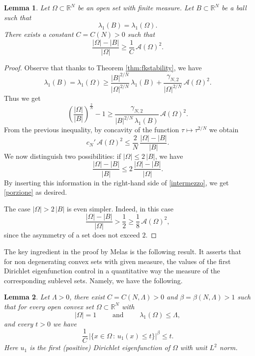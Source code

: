 \documentclass{amsart}
\newtheorem{lemma}{Lemma}[section]
\theoremstyle{definition}
\numberwithin{equation}{section}
\begin{document}
\begin{lemma}
\label{lm:porzione}
Let $\Omega\subset\mathbb{R}^N$ be an open set with finite measure. Let $B\subset\mathbb{R}^N$ be a ball such that 
\[
\lambda_1(B)=\lambda_1(\Omega).
\]
There exists a constant $C=C(N)>0$ such that
\begin{equation}
\label{porzione}
\frac{|\Omega|-|B|}{|\Omega|}\ge \frac{1}{C}\,\mathcal{A}(\Omega)^2.
\end{equation}
\end{lemma}
\begin{proof}
Observe that thanks to Theorem \ref{thm:fkstability}, we have
\[
\lambda_1(B)=\lambda_1(\Omega)\ge \frac{|B|^{2/N}}{|\Omega|^{2/N}}\,\lambda_1(B)+\frac{\gamma_{N,2}}{|\Omega|^{2/N}}\,\mathcal{A}(\Omega)^2.
\]
Thus we get
\[
\left(\frac{|\Omega|}{|B|}\right)^\frac{2}{N}-1\ge \frac{\gamma_{N,2}}{|B|^{2/N}\,\lambda_1(B)}\,\mathcal{A}(\Omega)^2.
\]
From the previous inequality, by concavity of the function $\tau\mapsto \tau^{2/N}$ we obtain
\begin{equation}
\label{intermezzo}
c_N'\,\mathcal{A}(\Omega)^2\le \frac{2}{N}\, \frac{|\Omega|-|B|}{|B|}.
\end{equation}
We now distinguish two possibilities: if $|\Omega|\le 2\,|B|$, we have
\[
\frac{|\Omega|-|B|}{|B|}\le 2\, \frac{|\Omega|-|B|}{|\Omega|}.
\]
By inserting this information in the right-hand side of \eqref{intermezzo}, we get \eqref{porzione} as desired.
\par
The case $|\Omega|>2\,|B|$ is even simpler. Indeed, in this case
\[
\frac{|\Omega|-|B|}{|\Omega|}>\frac{1}{2}\ge \frac{1}{8}\,\mathcal{A}(\Omega)^2,
\]
since the asymmetry of a set does not exceed $2$. 
\end{proof}
The key ingredient in the proof by Melas is the following result. It asserts that for non degenerating convex sets with given measure, the values of the first Dirichlet eigenfunction control in a quantitative way the measure of the corresponding sublevel sets. Namely, we have the following.
\begin{lemma}
\label{lm:keyofthekey}
Let $\Lambda>0$, there exist $C=C(N,\Lambda)>0$ and $\beta=\beta(N,\Lambda)>1$ such that for every open convex set $\Omega\subset\mathbb{R}^N$ with
\begin{equation}
\label{nonsqueezing}
|\Omega|=1\qquad \mbox{ and }\qquad \lambda_1(\Omega)\le \Lambda,
\end{equation}
and every $t> 0$ we have
\begin{equation}
\label{controllone}
\frac{1}{C}\,\Big|\{x\in\Omega\, :\, u_1(x)\le t\}\Big|^\beta\le t. 
\end{equation}
Here $u_1$ is the first (positive) Dirichlet eigenfunction of $\Omega$ with unit $L^2$ norm.
\end{lemma}
\end{document}
